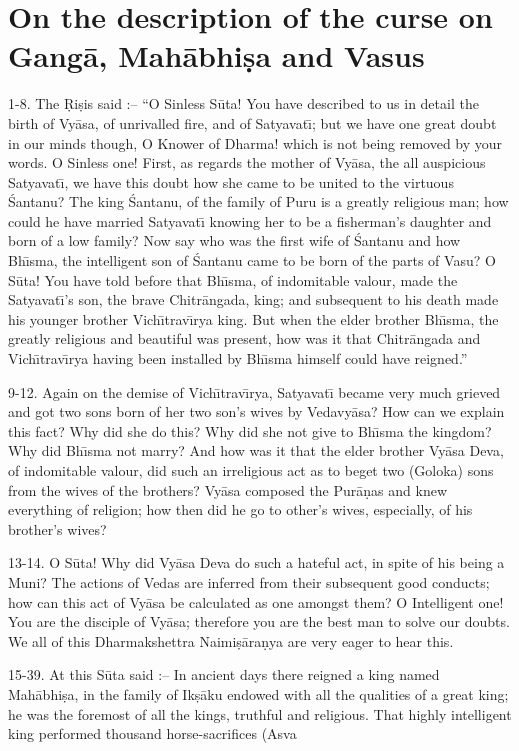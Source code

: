 \chapter{On the description of the curse on Gang\=a, Mah\=abhi\d{s}a and Vasus}

1-8. The \d{R}i\d{s}is said :-- ``O Sinless S\=uta! You have described to us in detail the birth of Vy\=asa, of unrivalled fire, and of Satyavat\={\i}; but we have one great doubt in our minds though, O Knower of Dharma! which is not being removed by your words. O Sinless one! First, as regards the mother of Vy\=asa, the all auspicious Satyavat\={\i}, we have this doubt how she came to be united to the virtuous \'Santanu? The king \'Santanu, of the family of Puru is a greatly religious man; how could he have married Satyavat\={\i} knowing her to be a fisherman's daughter and born of a low family? Now say who was the first wife of \'Santanu and how Bh\={\i}sma, the intelligent son of \'Santanu came to be born of the parts of Vasu? O S\=uta! You have told before that Bh\={\i}sma, of indomitable valour, made the Satyavat\={\i}'s son, the brave Chitr\=angada, king; and subsequent to his death made his younger brother Vich\={\i}trav\={\i}rya king. But when the elder brother Bh\={\i}sma, the greatly religious and beautiful was present, how was it that Chitr\=angada and Vich\={\i}trav\={\i}rya having been installed by Bh\={\i}sma himself could have reigned.''

9-12. Again on the demise of Vich\={\i}trav\={\i}rya, Satyavat\={\i} became very much grieved and got two sons born of her two son's wives by Vedavy\=asa? How can we explain this fact? Why did she do this? Why did she not give to Bh\={\i}sma the kingdom? Why did Bh\={\i}sma not marry? And how was it that the elder brother Vy\=asa Deva, of indomitable valour, did such an irreligious act as to beget two (Goloka) sons from the wives of the brothers? Vy\=asa composed the Pur\=a\d{n}as and knew everything of religion; how then did he go to other's wives, especially, of his brother's wives?

13-14. O S\=uta! Why did Vy\=asa Deva do such a hateful act, in spite of his being a Muni? The actions of Vedas are inferred from their subsequent good conducts; how can this act of Vy\=asa be calculated as one amongst them? O Intelligent one! You are the disciple of Vy\=asa; therefore you are the best man to solve our doubts. We all of this Dharmakshettra Naimi\d{s}\=ara\d{n}ya are very eager to hear this.

15-39. At this S\=uta said :-- In ancient days there reigned a king named Mah\=abhi\d{s}a, in the family of Ik\d{s}\=aku endowed with all the qualities of a great king; he was the foremost of all the kings, truthful and religious. That highly intelligent king performed thousand horse-sacrifices (Asva

